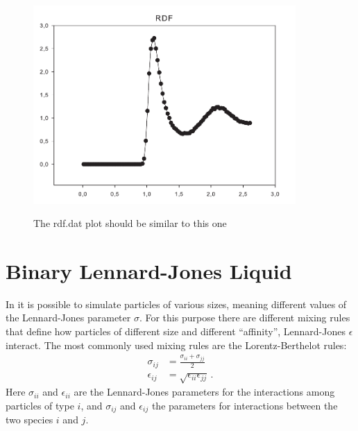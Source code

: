 \documentclass[
paper=a4,                       %
fontsize=11pt,                  %
twoside,                        %
footsepline,                    %
headsepline,                    %
headinclude=false,              %
footinclude=false,              %
pagesize,                       %
]{scrartcl}
\newtheorem{task}{Task}
\begin{document}
\begin{figure}[ht]
\begin{center}
\includegraphics[width=10cm]{figures/rdf}
\label{fig:rdf}
\caption{The rdf.dat plot should be similar to this one}
\end{center}
\end{figure}


\section{Binary Lennard-Jones Liquid}

In \es{} it is possible to simulate particles of various sizes, meaning different
values of the Lennard-Jones parameter $\sigma$. For this purpose there are different mixing
rules that define how particles of different size and different ``affinity'', Lennard-Jones $\epsilon$ interact. The most commonly used mixing rules are the
Lorentz-Berthelot rules:
\begin{align}
	\sigma_{ij}		& = \frac{\sigma_{ii} + \sigma_{jj}}{2} \\
	\epsilon_{ij}	& = \sqrt{\epsilon_{ii} \epsilon_{jj}} \,.
\end{align}
Here $\sigma_{ii}$ and $\epsilon_{ii}$ are the Lennard-Jones parameters for the
interactions among particles of type $i$, and $\sigma_{ij}$ and
$\epsilon_{ij}$ the parameters for interactions between the two species $i$ and $j$.

\vspace{1cm}\vspace{1cm}
\end{document}

